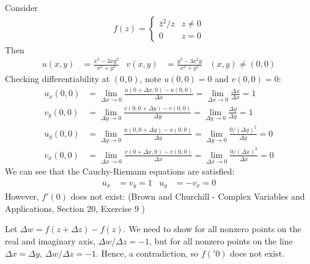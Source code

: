 \documentclass[12pt, english]{book}
\begin{document}
	\begin{example}
	\label{f(z) satisfy Cauchy-Riemann but f'(z_0) does not exist Example - Complex}
		Consider
		\begin{align*}
			f(z) = 
			\begin{cases}
				\bar{z}^2 / z & z \neq 0 \\
				0			  & z = 0
			\end{cases}
		\end{align*}
		Then
		\begin{align*}
			u(x,y) &= \frac{x^3 - 3xy^2}{x^2 + y^2} &
			v(x,y) &= \frac{y^3 - 3x^2y}{x^2 + y^2} & (x,y) \neq (0,0)
		\end{align*}
		Checking differentiability at \((0,0)\), note \(u(0,0) = 0\) and \(v(0,0) = 0\):
		\begin{align*}
			u_x(0,0) 
			&= \lim_{\Delta x \rightarrow 0} \frac{u(0+\Delta x, 0) - u(0,0)}{\Delta x}
			 = \lim_{\Delta x \rightarrow 0} \frac{\Delta x}{\Delta x} = 1 \\
			v_y(0,0) 
			&= \lim_{\Delta y \rightarrow 0} \frac{v(0, 0+\Delta y) - v(0,0)}{\Delta y}
			 = \lim_{\Delta y \rightarrow 0} \frac{\Delta y}{\Delta y} = 1 \\
			u_y(0,0) 
			 &= \lim_{\Delta y \rightarrow 0} \frac{u(0, 0+\Delta y) - u(0,0)}{\Delta y}
			  = \lim_{\Delta y \rightarrow 0} \frac{0/(\Delta y)^2}{\Delta y} = 0 \\
			v_x(0,0) 
			 &= \lim_{\Delta x \rightarrow 0} \frac{v(0+\Delta x, 0) - v(0,0)}{\Delta x}
			  = \lim_{\Delta x \rightarrow 0} \frac{0/(\Delta x)^2}{\Delta x} = 0
		\end{align*}
		We can see that the Cauchy-Riemann equations are satisfied: 
		\begin{align*}
			u_x &= v_y = 1	&	u_y &= -v_x = 0
		\end{align*}
		However, \(f'(0)\) does not exist: (Brown and Churchill - Complex Variables and Applications, Section 20, Exercise 9 \cite{Brown.J;Churchill.R-Complex-Variables-2014})
		
		Let \(\Delta w = f(z + \Delta z) - f(z)\). We need to show for all nonzero points on the real and imaginary axis, \(\Delta w/\Delta z = -1\), but for all nonzero points on the line \(\Delta x = \Delta y\), \(\Delta w / \Delta z = -1\). Hence, a contradiction, so \(f('0)\) does not exist.
		

\end{example}
\end{document}
